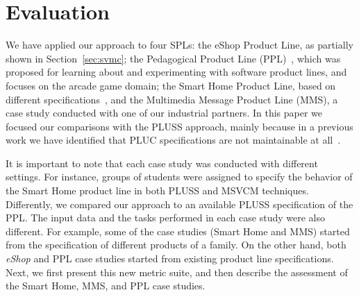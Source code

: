 \documentclass{sig-alt-full}
\begin{document}
\section{Evaluation}
\label{sec:evaluation}

We have applied our approach to four SPLs: the eShop Product Line, as partially
shown  in Section~\ref{sec:svmc}; the Pedagogical Product Line
(PPL)~\cite{PPL:2008}, which was proposed for learning about and experimenting
with software product lines, and focuses on the arcade game domain; the Smart
Home Product Line, based on different
specifications~\cite{Pohl:2005aa,Alferez:2008aa}, and the Multimedia Message
Product Line (MMS), a case study conducted with one of our industrial partners.  In this paper we focused our comparisons with
the PLUSS approach, mainly because in a previous work we have identified that PLUC specifications are not maintainable at all~\cite{Bonifacio:2008aa}. 


It is important to note that each case study was conducted with different
settings. For instance, groups of students were assigned to specify the behavior
of the Smart Home product line in both PLUSS and MSVCM techniques. Differently, we
compared our approach to an available PLUSS specification of the PPL. The input
data and the tasks performed in each case study were also different. For example,
some of the case studies (Smart Home and MMS) started from the specification of
different products of a family. On the other hand, both \emph{eShop} and PPL case
studies started from existing product line specifications. Next, we first present this new metric suite,
and then describe the assessment of the Smart Home, MMS, and PPL case studies. 
\end{document}
